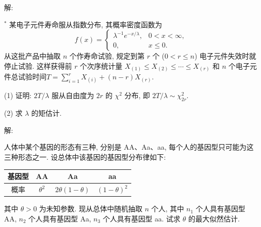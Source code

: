 \documentclass[standard]{ExBook}
\begin{document}
\begin{qitems}
\vspace{-5em}

    \begin{bbox}
解: 
    \end{bbox}

\vspace{-5em}

    \begin{bbox}
    \begin{shaded}
        \qitem$^*$
某电子元件寿命服从指数分布, 其概率密度函数为
\[f(x) = 
\begin{cases} 
\lambda^{-1} e^{-x/\lambda}, & 0 < x < \infty, \\
0, & x \leq 0.
\end{cases}\]
从这批产品中抽取 \( n \) 个作寿命试验, 规定到第 \( r \) 个 (\( 0 < r \leq n \)) 电子元件失效时就停止试验. 这样获得前 \( r \) 个次序统计量 \( X_{(1)} \leq X_{(2)} \leq \cdots \leq X_{(r)} \) 和 \( n \) 个电子元件总试验时间\(T = \displaystyle\sum\limits_{i=1}^{r} X_{(i)} + (n-r)X_{(r)}\).

(1) 证明: \( 2T/\lambda \) 服从自由度为 \( 2r \) 的 \( \chi^2 \) 分布, 即 \( 2T/\lambda \sim \chi_{2r}^2 \).  

(2) 求 \( \lambda \) 的矩估计.
    \end{shaded}
    \end{bbox}

\vspace{-5em}

    \begin{bbox}
解: 
    \end{bbox}

\vspace{-5em}

    \begin{bbox}
    \begin{shaded}
        \qitem
人体中某个基因的形态有三种, 分别是 AA、Aa、aa, 每个人的基因型只可能为这三种形态之一. 设总体中该基因的基因型分布律如下:

\begin{center}
\setlength{\tabcolsep}{45pt}
\begin{tabular}{c|ccc}
\hline
基因型 & AA & Aa & aa \\
\hline
概率 & \(\theta^2\) & \(2\theta(1-\theta)\) & \((1-\theta)^2\) \\
\hline
\end{tabular}
\end{center}

其中 \(\theta > 0\) 为未知参数. 现从总体中随机抽取 \(n\) 个人, 其中 \(n_1\) 个人具有基因型 AA, \(n_2\) 个人具有基因型 Aa, \(n_3\) 个人具有基因型 aa. 试求 \(\theta\) 的最大似然估计.
    \end{shaded}
    \end{bbox}


\end{qitems}
\end{document}
